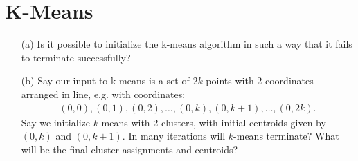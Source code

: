 \documentclass[11pt]{article}
\begin{document}
\section*{K-Means}

\begin{enumerate}
\item[(a)] Is it possible to initialize the k-means algorithm in such a way that it fails to terminate successfully?

\item[(b)] Say our input to k-means is a set of $2k$ points with 2-coordinates arranged in line, e.g. with coordinates:
{\small
\begin{align*}
(0,0), (0,1), (0, 2), \ldots, (0,k), (0,k+1), \ldots, (0,2k).
\end{align*}
}
Say we initialize $k$-means with 2 clusters, with initial centroids given by $(0,k)$ and $(0,k+1)$.  In many iterations will $k$-means terminate?  What will be the final cluster assignments and centroids?
\end{enumerate}
\end{document}
